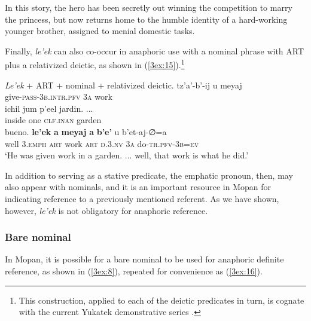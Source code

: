 \documentclass[output=paper]{langsci/langscibook}
\begin{document}
In this story, the hero has been secretly out winning the competition to marry the princess, but now returns home to the humble identity of a hard-working younger brother, assigned to menial domestic tasks.

Finally, {\emph{le'ek}} can also co-occur in anaphoric use with a nominal phrase with ART plus a relativized deictic, as shown in (\ref{3ex:15}).\footnote{This construction, applied to each of the deictic predicates in turn, is cognate with the current Yukatek demonstrative series \citep{hanks:90}.}


\begin{exe}
\ex\label{3ex:15}
{\emph{Le'ek}} + ART + nominal + relativized deictic.  
\exi{}
\gll	tz'a'-b'-ij	 				u 		meyaj	 \\
	give-{\textsc{pass-3b.intr.pfv}}		{\textsc{3a}}	work	\\
\glt
\exi{}
\gll	ichil 		jum	p'eel 		jardin. ... \\
	inside	one	{\textsc{clf.inan}}	garden \\
\glt
\exi{}
\gll	bueno. 	{\textbf{le'ek}} 	{\textbf{a}} 	{\textbf{meyaj}} 	{\textbf{a}}	{\textbf{b'e'}} 		u 		b'et-aj-∅=a  \\
	well		{\textsc{3.emph}}	{\textsc{art}}	work			{\textsc{art}}	{\textsc{d.3.nv}}	{\textsc{3a}}	do-{\textsc{tr.pfv-3b=ev}} \\
\glt	`He was given work in a garden. ... well, that work is what he did.'
\end{exe}

In addition to serving as a stative predicate, the emphatic pronoun, then, may also appear with nominals, and it is an important resource in Mopan for indicating reference to a previously mentioned referent. As we have shown, however, {\emph{le'ek}} is not obligatory for anaphoric reference.


\subsubsection{Bare nominal}\label{3sec:314}

In Mopan, it is possible for a bare nominal to be used for anaphoric definite reference, as shown in (\ref{3ex:8}), repeated for convenience as (\ref{3ex:16}).
\end{document}

